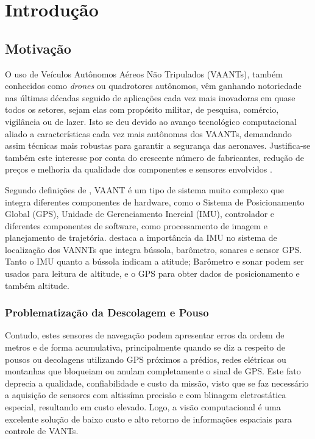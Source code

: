 \chapter{Introdução}

\section{Motivação}

O uso de Veículos Autônomos Aéreos Não Tripulados (VAANTs), também conhecidos como \textit{drones} ou quadrotores autônomos, vêm ganhando notoriedade nas últimas décadas seguido de aplicações cada vez mais inovadoras em quase todos os setores, sejam elas com propósito militar, de pesquisa, comércio, vigilância ou de lazer. Isto se deu devido ao avanço tecnológico computacional aliado a características cada vez mais autônomas dos VAANTs, demandando assim técnicas mais robustas para garantir a segurança das aeronaves. Justifica-se também este interesse por conta do crescente número de fabricantes, redução de preços e melhoria da qualidade dos componentes e sensores envolvidos \cite{Santos2014}.

Segundo definições de \citet{Duan2010}, VAANT é um tipo de sistema muito complexo que integra diferentes componentes de hardware, como o Sistema de Posicionamento Global (GPS), Unidade de Gerenciamento Inercial (IMU), controlador e diferentes componentes de software, como processamento de imagem e planejamento de trajetória. \citet{Costa2012} destaca a importância da IMU no sistema de localização dos VANNTs que integra bússola, barômetro, sonares e sensor GPS. Tanto o IMU quanto a bússola indicam a atitude; Barômetro e sonar podem ser usados para leitura de altitude, e o GPS para obter dados de posicionamento e também altitude. 

\subsection{Problematização da Descolagem e Pouso}

Contudo, estes sensores de navegação podem apresentar erros da ordem de metros e de forma acumulativa, principalmente quando se diz a respeito de pousos ou decolagens utilizando GPS próximos a prédios, redes elétricas ou montanhas que bloqueiam ou anulam completamente o sinal de GPS. Este fato deprecia a qualidade, confiabilidade e custo da missão, visto que se faz necessário a aquisição de sensores com altissíma precisão e com blinagem eletrostática especial, resultando em custo elevado. Logo, a visão computacional é uma excelente solução de baixo custo e alto retorno de informações espaciais para controle de VANTs.
 
